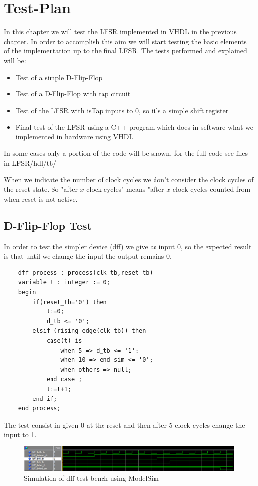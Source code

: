 \documentclass[a4paper]{report}
\begin{document}
\chapter{Test-Plan}
In this chapter we will test the LFSR implemented in VHDL in the previous chapter. In order to accomplish this aim we will start testing the basic elements of the implementation up to the final LFSR. The tests performed and explained will be:
\begin{itemize}
	\item Test of a simple D-Flip-Flop
	\item Test of a D-Flip-Flop with tap circuit
	\item Test of the LFSR with isTap inputs to 0, so it's a simple shift register
	\item Final test of the LFSR using a C++ program which does in software what we implemented in hardware using VHDL
\end{itemize}
In some cases only a portion of the code will be shown, for the full code see files in LFSR/hdl/tb/

\noindent When we indicate the number of clock cycles we don't consider the clock cycles of the reset state. So "after $x$ clock cycles" means "after $x$ clock cycles counted from when reset is not active.  

\section{D-Flip-Flop Test}
In order to test the simpler device (dff) we give as input 0, so the expected result is that until we change the input the output remains 0.
\begin{lstlisting}
	dff_process : process(clk_tb,reset_tb)
	variable t : integer := 0;
	begin
		if(reset_tb='0') then
			t:=0;
			d_tb <= '0';
		elsif (rising_edge(clk_tb)) then
			case(t) is
				when 5 => d_tb <= '1';	
				when 10 => end_sim <= '0';	
				when others => null;		
			end case ;
			t:=t+1;
		end if;
	end process;
\end{lstlisting}
The test consist in given 0 at the reset and then after 5 clock cycles change the input to 1.
\begin{figure}[htpb]
	\centering
	\includegraphics[width=.6\textheight, height=.125\textheight]{img/tb/wave_dff_test.png}
	\caption{Simulation of dff test-bench using ModelSim}
\end{figure}
\end{document}
